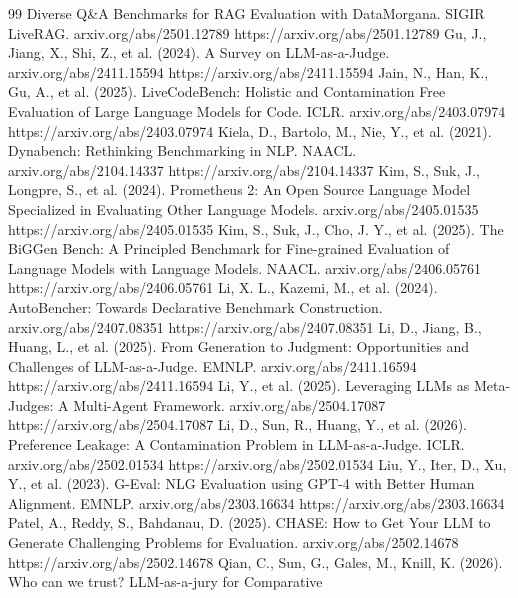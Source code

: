\documentclass[11pt,a4paper]{article}
\begin{document}
\begin{thebibliography}{99}
    Diverse Q\&A Benchmarks for RAG Evaluation with DataMorgana. SIGIR LiveRAG. arxiv.org/abs/2501.12789 https://arxiv.org/abs/2501.12789
\label{r19} Gu, J., Jiang, X., Shi, Z., et al. (2024). A Survey on LLM-as-a-Judge. arxiv.org/abs/2411.15594 https://arxiv.org/abs/2411.15594
\label{r23} Jain, N., Han, K., Gu, A., et al. (2025). LiveCodeBench: Holistic and Contamination Free Evaluation
    of Large Language Models for Code. ICLR. arxiv.org/abs/2403.07974 https://arxiv.org/abs/2403.07974
\label{r14} Kiela, D., Bartolo, M., Nie, Y., et al. (2021). Dynabench: Rethinking Benchmarking in NLP. NAACL. arxiv.org/abs/2104.14337 https://arxiv.org/abs/2104.14337
\label{r3} Kim, S., Suk, J., Longpre, S., et al. (2024). Prometheus 2: An Open Source Language Model Specialized
    in Evaluating Other Language Models. arxiv.org/abs/2405.01535 https://arxiv.org/abs/2405.01535
\label{r7} Kim, S., Suk, J., Cho, J. Y., et al. (2025). The BiGGen Bench: A Principled Benchmark for Fine-grained
    Evaluation of Language Models with Language Models. NAACL. arxiv.org/abs/2406.05761 https://arxiv.org/abs/2406.05761
\label{r9} Li, X. L., Kazemi, M., et al. (2024). AutoBencher: Towards Declarative Benchmark Construction. arxiv.org/abs/2407.08351 https://arxiv.org/abs/2407.08351
\label{r20} Li, D., Jiang, B., Huang, L., et al. (2025). From Generation to Judgment: Opportunities and
    Challenges of LLM-as-a-Judge. EMNLP. arxiv.org/abs/2411.16594 https://arxiv.org/abs/2411.16594
\label{r26} Li, Y., et al. (2025). Leveraging LLMs as Meta-Judges: A Multi-Agent Framework. arxiv.org/abs/2504.17087 https://arxiv.org/abs/2504.17087
\label{r15} Li, D., Sun, R., Huang, Y., et al. (2026). Preference Leakage: A Contamination Problem in
    LLM-as-a-Judge. ICLR. arxiv.org/abs/2502.01534 https://arxiv.org/abs/2502.01534
\label{r2} Liu, Y., Iter, D., Xu, Y., et al. (2023). G-Eval: NLG Evaluation using GPT-4 with Better Human
    Alignment. EMNLP. arxiv.org/abs/2303.16634 https://arxiv.org/abs/2303.16634
\label{r30} Patel, A., Reddy, S., Bahdanau, D. (2025). CHASE: How to Get Your LLM to Generate Challenging
    Problems for Evaluation. arxiv.org/abs/2502.14678 https://arxiv.org/abs/2502.14678
\label{r27} Qian, C., Sun, G., Gales, M., Knill, K. (2026). Who can we trust? LLM-as-a-jury for Comparative

\end{thebibliography}
\end{document}
